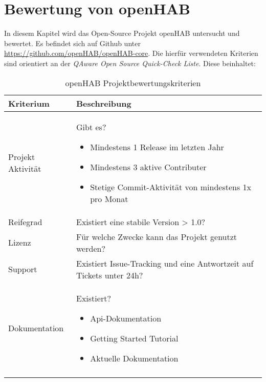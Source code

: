 \section{Bewertung von openHAB}
In diesem Kapitel wird das Open-Source Projekt openHAB untersucht und bewertet. Es befindet sich auf Github unter \url{https://github.com/openHAB/openHAB-core}. Die hierfür verwendeten Kriterien sind orientiert an der \textit{QAware Open Source Quick-Check Liste}.
Diese beinhaltet:
\begin{longtable}{| p{3cm} | p{12cm}|}
	\hline
	\textbf{Kriterium} & \textbf{Beschreibung} \\
	\hline \hline
	\centering Projekt Aktivität & Gibt es?
	\begin{itemize}
		\item Mindestens 1 Release im letzten Jahr
		\item Mindestens 3 aktive Contributer
		\item Stetige Commit-Aktivität von mindestens 1x pro Monat
	\end{itemize}\\
	\hline
	\centering Reifegrad & Existiert eine stabile Version > 1.0?  \\
	\hline
	\centering Lizenz & Für welche Zwecke kann das Projekt genutzt werden? \\
	\hline
	\centering Support & Existiert Issue-Tracking und eine Antwortzeit auf Tickets unter 24h? \\
	\hline
	\centering Dokumentation & Existiert?
	\begin{itemize}
		\item Api-Dokumentation
		\item Getting Started Tutorial
		\item Aktuelle Dokumentation
	\end{itemize} \\
	\hline
	\caption{openHAB Projektbewertungskriterien}
	\label{table:openHAB-judgement-criteria}
\end{longtable}

